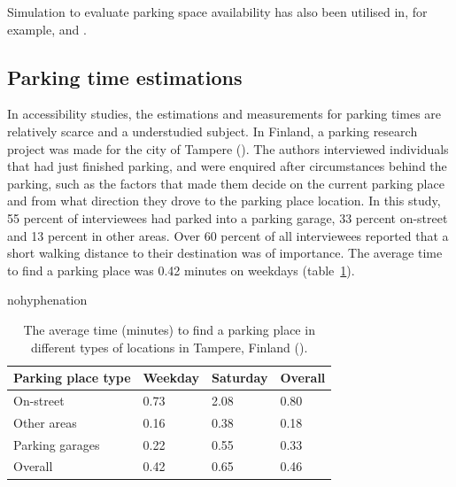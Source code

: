 Simulation to evaluate parking space availability has also been utilised in, for example,  and .

\newpage
\subsection{Parking time estimations}
\justify

In accessibility studies, the estimations and measurements for parking times are relatively scarce and a understudied subject. In Finland, a parking research project was made for the city of Tampere (\cite{Kalenoja2003}). The authors interviewed individuals that had just finished parking, and were enquired after circumstances behind the parking, such as the factors that made them decide on the current parking place and from what direction they drove to the parking place location. In this study, 55 percent of interviewees had parked into a parking garage, 33 percent on-street and 13 percent in other areas. Over 60 percent of all interviewees reported that a short walking distance to their destination was of importance. The average time to find a parking place was 0.42 minutes on weekdays (table~\ref{tab:kalenoja-parktimes}).

\begin{hyphenrules}{nohyphenation}
    \begin{table}[H]
        \centering
        \caption[Parking time results in Kalenoja \& Häyrynen 2003]{The average time (minutes) to find a parking place in different types of locations in Tampere, Finland (\cite{Kalenoja2003}).} 
        \label{tab:kalenoja-parktimes}
        \begin{tabular}{ llll }
            \toprule
            Parking place type  & Weekday   & Saturday  & Overall \\
            \midrule
            On-street           & 0.73      & 2.08      & 0.80 \\
            Other areas         & 0.16      & 0.38      & 0.18 \\
            Parking garages     & 0.22      & 0.55      & 0.33 \\
            Overall             & 0.42      & 0.65      & 0.46 \\
            \bottomrule
        \end{tabular}
    \end{table}
\end{hyphenrules}

